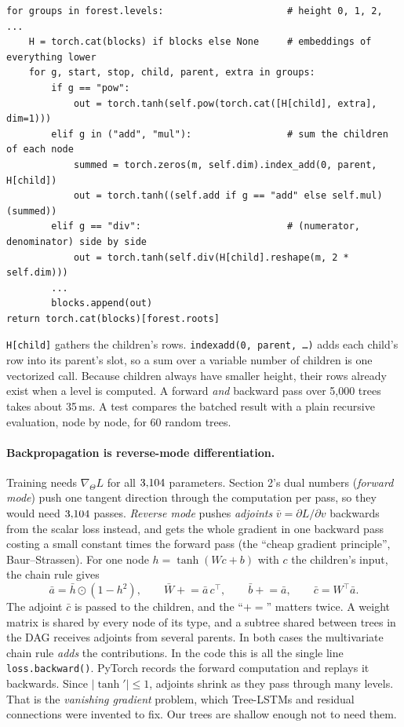 \documentclass[11pt]{article}
\theoremstyle{definition}
\theoremstyle{plain}
\theoremstyle{remark}
\newcommand{\code}[1]{\texttt{#1}}
\renewcommand{\_}{\oldunderscore\allowbreak}
\newcommand{\file}[1]{\textcolor{blue!50!black}{\texttt{#1}}}
\newcommand{\codefrom}[1]{\par\smallskip\noindent{\footnotesize\textbf{From} \file{#1}}}
\begin{document}
\codefrom{src/calcdiff/models/tree\_net.py}
\begin{lstlisting}
for groups in forest.levels:                      # height 0, 1, 2, ...
    H = torch.cat(blocks) if blocks else None     # embeddings of everything lower
    for g, start, stop, child, parent, extra in groups:
        if g == "pow":
            out = torch.tanh(self.pow(torch.cat([H[child], extra], dim=1)))
        elif g in ("add", "mul"):                 # sum the children of each node
            summed = torch.zeros(m, self.dim).index_add(0, parent, H[child])
            out = torch.tanh((self.add if g == "add" else self.mul)(summed))
        elif g == "div":                          # (numerator, denominator) side by side
            out = torch.tanh(self.div(H[child].reshape(m, 2 * self.dim)))
        ...
        blocks.append(out)
return torch.cat(blocks)[forest.roots]
\end{lstlisting}
\code{H[child]} gathers the children's rows. \code{index\_add(0, parent, \dots)} adds each child's row into its parent's slot, so a sum over a variable number of children
is one vectorized call. Because children always have smaller height, their rows already exist when a level is computed. A forward \emph{and} backward pass over 5{,}000 trees
takes about 35\,ms. A test compares the batched result with a plain recursive evaluation, node by node, for 60 random trees.

\paragraph{Backpropagation is reverse-mode differentiation.}
Training needs $\nabla_\Theta L$ for all $3{,}104$ parameters. Section 2's dual numbers (\emph{forward mode}) push one tangent direction through the
computation per pass, so they would need $3{,}104$ passes. \emph{Reverse mode} pushes \emph{adjoints} $\bar v=\partial L/\partial v$ backwards from the scalar loss instead,
and gets the whole gradient in one backward pass costing a small constant times the forward pass (the ``cheap gradient principle'', Baur--Strassen).
For one node $h=\tanh(Wc+b)$ with $c$ the children's input, the chain rule gives
\[
  \bar a=\bar h\odot(1-h^2),\qquad \bar W\mathrel{+}=\bar a\,c^\top,\qquad \bar b\mathrel{+}=\bar a,\qquad \bar c=W^\top\bar a .
\]
The adjoint $\bar c$ is passed to the children, and the ``$+=$'' matters twice. A weight matrix is shared by every node of its type, and a subtree shared between trees in the DAG
receives adjoints from several parents. In both cases the multivariate chain rule \emph{adds} the contributions. In the code this is all the single line
\code{loss.backward()}. PyTorch records the forward computation and replays it backwards. Since $|\tanh'|\le1$, adjoints shrink as they pass through many levels.
That is the \emph{vanishing gradient} problem, which Tree-LSTMs and residual connections were invented to fix. Our trees are shallow enough not to need them.
\end{document}
